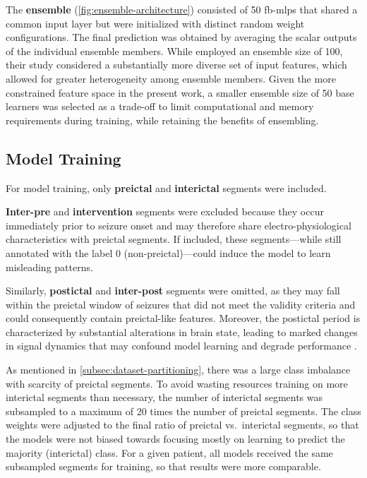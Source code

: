 The \textbf{ensemble} (\cref{fig:ensemble-architecture}) consisted of 50 \glspl{fb-mlp} that shared a common input layer but were initialized with distinct random weight configurations.
The final prediction was obtained by averaging the scalar outputs of the individual ensemble members.
While \textcite{muller_coherent_2022} employed an ensemble size of 100, their study considered
 a substantially more diverse set of input features, which allowed for greater heterogeneity among ensemble members.
Given the more constrained feature space in the present work, a smaller ensemble size of 50 base learners was selected as a trade-off to limit computational and memory requirements during training, while retaining the benefits of ensembling.


\subsection{Model Training} \label{subsec:model-training}
For model training, only \textbf{preictal} and \textbf{interictal} segments were included. 

\textbf{Inter-pre} and \textbf{intervention} segments were excluded because they occur immediately prior to seizure onset and may therefore share electro-physiological characteristics with preictal segments. 
If included, these segments—while still annotated with the label 0 (non-preictal)—could induce the model to learn misleading patterns.

Similarly, \textbf{postictal} and \textbf{inter-post} segments were omitted, as they may fall within the preictal window of seizures that did not meet the validity criteria and could consequently contain preictal-like features. 
Moreover, the postictal period is characterized by substantial alterations in brain state, leading to marked changes in signal dynamics that may confound model learning and degrade performance \parencite{muller_coherent_2022}.

As mentioned in \cref{subsec:dataset-partitioning}, there was a large class imbalance with scarcity of preictal segments.
To avoid wasting resources training on more interictal segments than necessary, the number of interictal segments was subsampled to a maximum of 20 times the number of preictal segments.
The class weights were adjusted to the final ratio of preictal vs.\ interictal segments, so that the models were not biased towards focusing mostly on learning to predict the majority (interictal) class.
For a given patient, all models received the same subsampled segments for training, so that results were more comparable.

